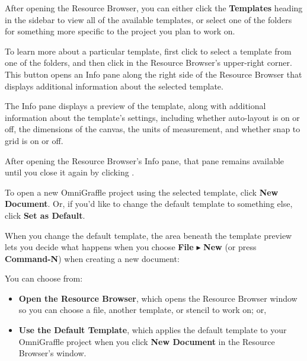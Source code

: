 \documentclass[../main.tex]{subfiles}
\begin{document}

After opening the Resource Browser, you can either click the \textbf{Templates} heading in the
sidebar to view all of the available templates, or select one of the folders for something
more specific to the project you plan to work on.

To learn more about a particular template, first click to select a template from one of the
folders, and then click  in the Resource
Browser's upper-right corner. This button opens an Info pane along the right side of the
Resource Browser that displays additional information about the selected template.


The Info pane displays a preview of the template, along with additional information about the
template's settings, including whether auto-layout is on or off, the dimensions of the canvas,
the units of measurement, and whether snap to grid is on or off.

\begin{ognote}
  After opening the Resource Browser's Info pane, that pane remains available until you close it
  again by clicking .
\end{ognote}

To open a new OmniGraffle project using the selected template, click \textbf{New Document}. Or,
if you'd like to change the default template to something else, click \textbf{Set as Default}.


When you change the default template, the area beneath the template preview lets you decide what
happens when you choose \textbf{File} $\blacktriangleright$ \textbf{New} (or press
\textbf{Command-N}) when creating a new document:


You can choose from:

\begin{itemize}
  \item \textbf{Open the Resource Browser}, which opens the Resource Browser window so you can
    choose a file, another template, or stencil to work on; or,
  \item \textbf{Use the Default Template}, which applies the default template to your
    OmniGraffle project when you click \textbf{New Document} in the Resource Browser's window.
\end{itemize}
\end{document}
